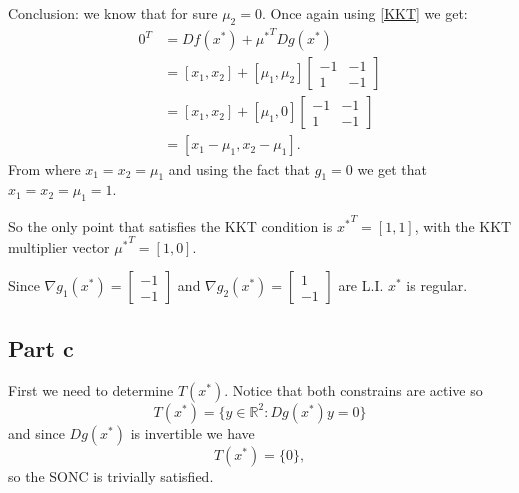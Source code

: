 \documentclass{article}
\begin{document}
Conclusion: we know that for sure $\mu_2=0$. Once again using
\ref{KKT} we get:
\begin{align*}
0^T&=Df(x^*)+{\mu^*}^TDg(x^*)\\
&=[x_1,x_2]+[\mu_1,\mu_2]\begin{bmatrix}
-1 & -1\\
1 & -1
\end{bmatrix}\\
&=[x_1,x_2]+[\mu_1,0]\begin{bmatrix}
-1 & -1\\
1 & -1
\end{bmatrix}\\
&=[ x_1-\mu_1, x_2-\mu_1].
\end{align*}
From where $x_1=x_2=\mu_1$ and using the fact that $g_1=0$ we get that
$x_1=x_2=\mu_1=1$.

So the only point that satisfies the KKT condition is ${x^*}^T=[1,1]$, with the
KKT multiplier vector ${\mu^*}^T=[1,0]$.

Since $\nabla g_1(x^*)=\begin{bmatrix} -1\\-1\end{bmatrix}$ and $\nabla
g_2(x^*)=\begin{bmatrix} 1\\-1\end{bmatrix}$ are L.I. $x^*$ is regular.
\subsection*{Part c}
First we need to determine $T(x^*)$. Notice that both constrains are active so
\[
	T(x^*)=\{y\in \mathbb{R}^2:Dg(x^*)y=0\}
\]
and since $Dg(x^*)$ is invertible we have
\[
	T(x^*)=\{0\},
\]
so the SONC is trivially satisfied.
\end{document}
